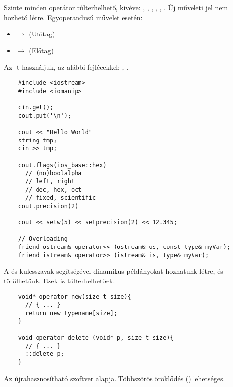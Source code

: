 \documentclass[main.tex]{subfiles}
\begin{document}
  Szinte minden operátor túlterhelhető, kivéve:
  \kkod{::}, , , ,
  , .
  Új műveleti jel nem hozhetó létre.
  Egyoperandusú művelet esetén:
  \begin{itemize}
    \item {}
    \hspace{11.5mm} $\rightarrow$ \hspace{5mm}
     \hspace{5mm} (Utótag)

    \item {}
    \hspace{5mm} $\rightarrow$ \hspace{5mm}
     \hspace{5mm} (Előtag)
  \end{itemize}


  Az -t használjuk, az alábbi fejlécekkel:
  , .
  \begin{lstlisting}
    #include <iostream>
    #include <iomanip>

    cin.get();
    cout.put('\n');

    cout << "Hello World"
    string tmp;
    cin >> tmp;

    cout.flags(ios_base::hex)
      // (no)boolalpha
      // left, right
      // dec, hex, oct
      // fixed, scientific
    cout.precision(2)

    cout << setw(5) << setprecision(2) << 12.345;

    // Overloading
    friend ostream& operator<< (ostream& os, const type& myVar);
    friend istream& operator>> (istream& is, type& myVar);
  \end{lstlisting}


  A  és  kulcsszavak segítségével
  dinamikus példányokat hozhatunk létre, és törölhetünk.
  Ezek is túlterhelhetőek:
  \begin{lstlisting}
    void* operator new(size_t size){
      // { ... }
      return new typename[size];
    }

    void operator delete (void* p, size_t size){
      // { ... }
      ::delete p;
    }
  \end{lstlisting}


  Az újrahasznosítható szoftver alapja.
  Többszörös öröklődés () lehetséges.
\end{document}
